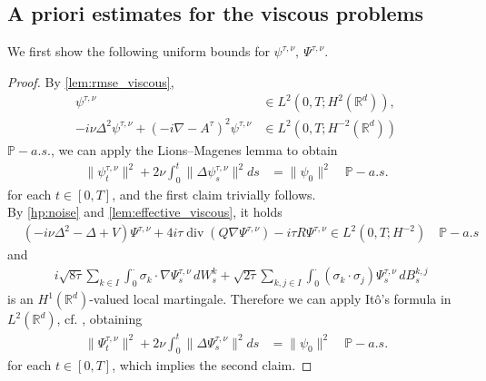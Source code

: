 \documentclass[a4paper,10pt]{amsart}
\newcommand{\R}{\mathbb{R}}
\newtheorem{lemma}[theorem]{Lemma}
\theoremstyle{remark}
\numberwithin{equation}{section}
\begin{document}
\subsection{A priori estimates for the viscous problems}
We first show the following uniform bounds for $\psi^{\tau,\nu},\ \Psi^{\tau,\nu}$.
\begin{proof}
	    By \cref{lem:rmse_viscous},
	    \begin{align*}
	     \psi^{\tau,\nu}&\in L^2(0,T;H^2(\R^d)),\\
	     -i\nu \Delta^2 \psi^{\tau,\nu}
	     +(-i\nabla- A^{\tau} )^2\psi^{\tau,\nu}
	     &\in L^2(0,T;H^{-2}(\R^d))
    \end{align*}
    $\mathbb{P}-a.s.$, we can apply the Lions--Magenes lemma to obtain
    \begin{align*}
\|\psi^{\tau,\nu}_t\|^2+2\nu\int_0^t \|\Delta \psi^{\tau,\nu}_s\|^2 ds &=\|\psi_0\|^2\quad\mathbb{P}-a.s.
    \end{align*}
    for each $t\in [0,T]$, and the first claim trivially follows.\\
    By \cref{hp:noise} and \cref{lem:effective_viscous}, it holds
\begin{align*}
    &(-i\nu\Delta^2-\Delta+V)\Psi^{\tau,\nu}
    +4i\tau\operatorname{div}(Q\nabla\Psi^{\tau,\nu})
    -i\tau R\Psi^{\tau,\nu}\in L^2(0,T;H^{-2})
    \quad\mathbb{P}-a.s 
\end{align*}
and 
\begin{align*}
    &i\sqrt{8\tau}\sum_{k\in I}\int_0^\cdot
    \sigma_k\cdot\nabla\Psi^{\tau,\nu}_s\,dW^k_s+\sqrt{2\tau}\sum_{k,j\in I}\int_0^\cdot
    (\sigma_k\cdot\sigma_j)\Psi^{\tau,\nu}_s\,dB^{k,j}_s
\end{align*}
	 is an $H^1(\R^d)$-valued local martingale. Therefore we can apply It\^o's formula in $L^2(\R^d)$, cf. \cite[Theorem 2.13]{rozovskii2012stochastic}, obtaining
 \begin{align*}
     \|\Psi^{\tau,\nu}_t\|^2+2\nu\int_0^t \|\Delta \Psi^{\tau,\nu}_s\|^2 ds &=\|\psi_0\|^2\quad\mathbb{P}-a.s.
 \end{align*}
 for each $t\in [0,T]$, which implies the second claim.
\end{proof}
\end{document}
